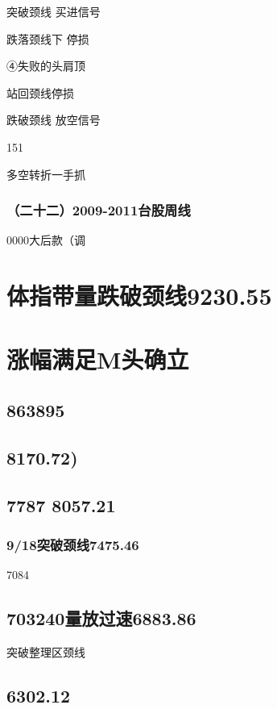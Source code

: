 \documentclass{article}
\begin{document}
突破颈线 买进信号

跌落颈线下 停损

④失败的头肩顶

站回颈线停损

跌破颈线 放空信号

151

\clearpage

多空转折一手抓

\subsubsection{（二十二）2009-2011台股周线}

0000大后款（调

\section{体指带量跌破颈线9230.55}

\section{涨幅满足M头确立}

\subsection{863895}

\subsection{8170.72)}

\subsection{7787 8057.21}

\subsubsection{9/18突破颈线7475.46}

7084

\subsection{703240量放过速6883.86}

突破整理区颈线

\subsection{6302.12}
\end{document}
